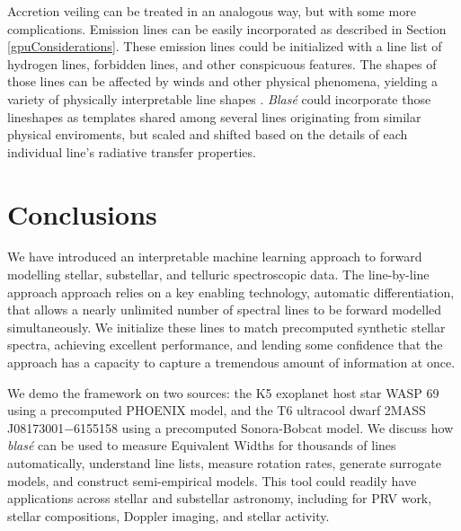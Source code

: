 \documentclass[trackchanges]{aastex631}
\begin{document}
Accretion veiling can be treated in an analogous way, but with some more complications.  Emission lines can be easily incorporated as described in Section \ref{gpuConsiderations}.
These emission lines could be initialized with a line list of hydrogen lines, forbidden lines, and other conspicuous features.  The shapes of those lines can be affected by winds and other physical phenomena, yielding a variety of physically interpretable line shapes \citep{2022arXiv220802940E}.   \emph{Blas\'e} could incorporate those lineshapes as templates shared among several lines originating from similar physical enviroments, but scaled and shifted based on the details of each individual line's radiative transfer properties.



\section{Conclusions}
We have introduced an interpretable machine learning approach to forward modelling stellar, substellar, and telluric spectroscopic data.  The line-by-line approach approach relies on a key enabling technology, automatic differentiation, that allows a nearly unlimited number of spectral lines to be forward modelled simultaneously.  We initialize these lines to match precomputed synthetic stellar spectra, achieving excellent performance, and lending some confidence that the approach has a capacity to capture a tremendous amount of information at once.

We demo the framework on two sources: the K5 exoplanet host star WASP 69 using a precomputed PHOENIX model, and the T6 ultracool dwarf 2MASS J08173001$-$6155158 using a precomputed Sonora-Bobcat model.  We discuss how  \emph{blas\'e} can be used to measure Equivalent Widths for thousands of lines automatically, understand line lists, measure rotation rates, generate surrogate models, and construct semi-empirical models.  This tool could readily have applications across stellar and substellar astronomy, including for PRV work, stellar compositions, Doppler imaging, and stellar activity.
\end{document}
